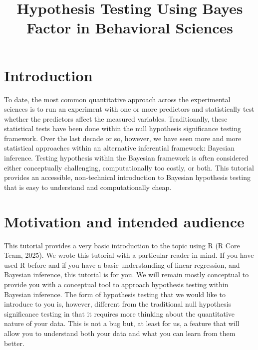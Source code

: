 \documentclass[
  doc,
  longtable,
  nolmodern,
  notxfonts,
  notimes,
  colorlinks=true,linkcolor=blue,citecolor=blue,urlcolor=blue]{apa7}
\title{Hypothesis Testing Using Bayes Factor in Behavioral Sciences}
\begin{document}
\maketitle



\setcounter{secnumdepth}{3}

\setlength\LTleft{0pt}




\section{Introduction}\label{introduction}

To date, the most common quantitative approach across the experimental
sciences is to run an experiment with one or more predictors and
statistically test whether the predictors affect the measured variables.
Traditionally, these statistical tests have been done within the null
hypothesis significance testing framework. Over the last decade or so,
however, we have seen more and more statistical approaches within an
alternative inferential framework: Bayesian inference. Testing
hypothesis within the Bayesian framework is often considered either
conceptually challenging, computationally too costly, or both. This
tutorial provides an accessible, non-technical introduction to Bayesian
hypothesis testing that is easy to understand and computationally cheap.

\section{Motivation and intended
audience}\label{motivation-and-intended-audience}

This tutorial provides a very basic introduction to the topic using R (R
Core Team, 2025). We wrote this tutorial with a particular reader in
mind. If you have used R before and if you have a basic understanding of
linear regression, and Bayesian inference, this tutorial is for you. We
will remain mostly conceptual to provide you with a conceptual tool to
approach hypothesis testing within Bayesian inference. The form of
hypothesis testing that we would like to introduce to you is, however,
different from the traditional null hypothesis significance testing in
that it requires more thinking about the quantitative nature of your
data. This is not a bug but, at least for us, a feature that will allow
you to understand both your data and what you can learn from them
better.
\end{document}
